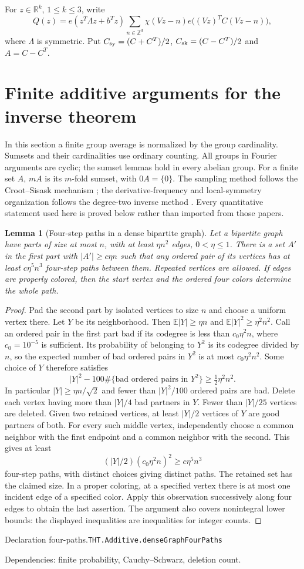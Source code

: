 \documentclass[11pt]{article}
\newtheorem{lemma}[theorem]{Lemma}
\theoremstyle{definition}
\newcommand{\R}{\mathbb R}
\newcommand{\Z}{\mathbb Z}
\newcommand{\E}{\mathbb E}
\numberwithin{equation}{section}
\newcommand{\bp}[3]{\par\smallskip\begingroup\footnotesize
\noindent\hypertarget{bp:#1}{\textsf{Declaration #1.}}\quad\nolinkurl{#2}\par
\noindent\textsf{Dependencies:} #3.\par\endgroup\smallskip}
\begin{document}
For $z\in\R^k$, $1\le k\le3$, write
\[
 Q(z)=e(z^T\Lambda z+b^Tz)\sum_{n\in\Z^d}\chi(Vz-n)e\bigl((Vz)^TC(Vz-n)\bigr),
\]
where $\Lambda$ is symmetric. Put $C_{\rm sy}=(C+C^T)/2$, $C_{\rm sk}=(C-C^T)/2$ and $A=C-C^T$.



\section{Finite additive arguments for the inverse theorem}\label{sec:additive}
In this section a finite group average is normalized by the group cardinality. Sumsets and their cardinalities use ordinary counting. All groups in Fourier arguments are cyclic; the sumset lemmas hold in every abelian group. For a finite set $A$, $mA$ is its $m$-fold sumset, with $0A=\{0\}$. The sampling method follows the Croot--Sisask mechanism \cite{CS}; the derivative-frequency and local-symmetry organization follows the degree-two inverse method \cite{GT}. Every quantitative statement used here is proved below rather than imported from those papers.

\begin{lemma}[Four-step paths in a dense bipartite graph]\label{lem:four-paths}
Let a bipartite graph have parts of size at most $n$, with at least $\eta n^2$ edges, $0<\eta\le1$. There is a set $A'$ in the first part with $|A'|\ge c\eta n$ such that any ordered pair of its vertices has at least $c\eta^5n^3$ four-step paths between them. Repeated vertices are allowed. If edges are properly colored, then the start vertex and the ordered four colors determine the whole path.
\end{lemma}
\begin{proof}
Pad the second part by isolated vertices to size $n$ and choose a uniform vertex there. Let $Y$ be its neighborhood. Then $\E|Y|\ge\eta n$ and $\E|Y|^2\ge\eta^2n^2$. Call an ordered pair in the first part bad if its codegree is less than $c_0\eta^2n$, where $c_0=10^{-5}$ is sufficient. Its probability of belonging to $Y^2$ is its codegree divided by $n$, so the expected number of bad ordered pairs in $Y^2$ is at most $c_0\eta^2n^2$. Some choice of $Y$ therefore satisfies
\[
 |Y|^2-100\#\{\text{bad ordered pairs in }Y^2\}\ge\tfrac12\eta^2n^2.
\]
In particular $|Y|\ge\eta n/\sqrt2$ and fewer than $|Y|^2/100$ ordered pairs are bad. Delete each vertex having more than $|Y|/4$ bad partners in $Y$. Fewer than $|Y|/25$ vertices are deleted. Given two retained vertices, at least $|Y|/2$ vertices of $Y$ are good partners of both. For every such middle vertex, independently choose a common neighbor with the first endpoint and a common neighbor with the second. This gives at least
\[
 (|Y|/2)(c_0\eta^2n)^2\ge c\eta^5n^3
\]
four-step paths, with distinct choices giving distinct paths. The retained set has the claimed size. In a proper coloring, at a specified vertex there is at most one incident edge of a specified color. Apply this observation successively along four edges to obtain the last assertion. The argument also covers nonintegral lower bounds: the displayed inequalities are inequalities for integer counts.
\end{proof}
\bp{four-paths}{THT.Additive.denseGraphFourPaths}{finite probability, Cauchy--Schwarz, deletion count}
\end{document}
